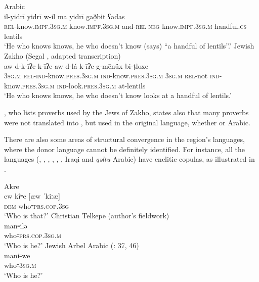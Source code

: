 \documentclass[output=paper]{langsci/langscibook}
\begin{document}
\ea\label{bkm:Ref534225045} Arabic \citep[235]{Chyet1995} \\
\gll il-yidrī   yidrī     w-il ma yidrī     gað̣bit ʕadas\\
    \textsc{rel}\textup{{}-know.}\textsc{impf.3sg.m} \textup{know.}\textsc{impf.3sg.m} \textup{and-}\textsc{rel} \textsc{neg} \textup{know.}\textsc{impf.3sg.m} handful\textsc{.cs} lentils\\
\glt ‘He who knows knows, he who doesn’t know (says) “a handful of lentils”.’
\ex\label{bkm:Ref534225057}Jewish Zakho  (Segal \citeyear[262]{Segal1955}, adapted transcription)\\
\gll aw d-k-īʔe   k-īʔe     aw d-lá k-īʔe   g-mēnüx bi-ṭloxe\\
    \textsc{3sg.m} \textsc{rel}\textup{{}-}\textsc{ind-}\textup{know}\textsc{.pres.3sg.m} \textsc{ind}\textup{{}-know.}\textsc{pres.3sg.m} \textsc{3sg.m} \textsc{rel}\textup{{}-not} \textsc{ind}\textup{{}-know.}\textsc{pres.3sg.m} \textsc{ind-}\textup{look.}\textsc{pres}.\textsc{3sg.m} \textup{at-lentils}\\
\glt ‘He who knows knows, he who doesn’t know looks at a handful of lentils.’\z

\citet{Sabar1978}, who lists proverbs used by the {Jews} of Zakho, states also that many proverbs were not translated into , but used in the original language, whether  or Arabic.

There are also some areas of structural {convergence} in the region’s languages, where the donor language cannot be definitely identified. For instance, all the languages (, , , , , , Iraqi  and \textit{qəltu} Arabic) have enclitic copulas, as illustrated in .

\ea\label{bkm:Ref534225894}Akre  \citep[175]{MacKenzie1961}\\
\gll ew kî꞊e \textup{[æw ˈkiːæ]}\\
     \textsc{dem} who꞊\textsc{prs.cop.3sg}\\
\glt ‘Who is that?’ 
\ex Christian Telkepe  (author’s fieldwork)\\
\gll man꞊ilə\\
     who꞊\textsc{prs.cop.3sg.m}\\
\glt ‘Who is he?’
\ex\label{bkm:Ref534225903}Jewish Arbel Arabic (\citealt{Jastrow1990book}: 37, 46) \\
\gll mani꞊we\\
     who꞊\textsc{3sg.m}\\
\glt ‘Who is he?’\z
\end{document}
